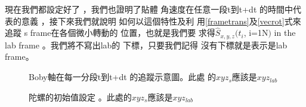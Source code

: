 \documentclass[12pt,a4paper]{article}
\begin{document}
現在我們都設定好了%
，我們也證明了貼體%
角速度在任意一段t到t+dt%
的時間中代表的意義%
，接下來我們就說明%
如何以這個特性及利%
用\ref{frametrans}及\ref{vecrot}式來追蹤%
s frame在各個微小轉動的%
位置，也就是我們要%
求得$\hat{S}_{x,y,z}(t_{i}$, i=1N$)$ in the lab frame%
。\bigskip 我們將不寫出lab的%
下標，只要我們記得%
沒有下標就是表示是lab
frame。

\begin{figure}[th]
\caption{Boby軸在每一分段t到t+dt%
的追蹤示意圖。此處%
的$xyz_{s}$應該是$xyz_{lab}$}
\begin{center}
\end{center}
\end{figure}

\begin{figure}[th]
\caption{陀螺的初始值設定%
。此處的$xyz_{s}$應該是$xyz_{lab}$}
\begin{center}
\end{center}
\end{figure}
\end{document}
